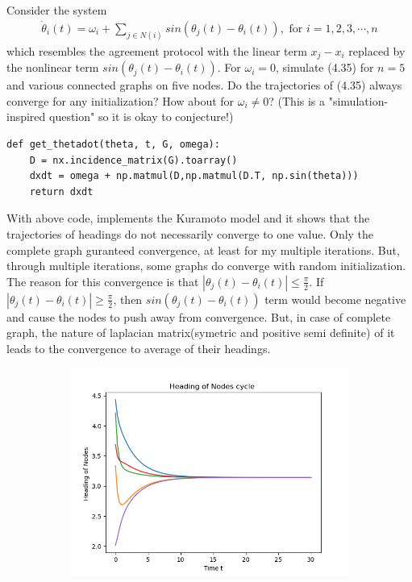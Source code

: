 \documentclass{article}
\begin{document}
\begin{problem}
    Consider the system
    \begin{align*}
        \dot{\theta}_i(t) = \omega_i + \sum_{j \in N(i)} sin(\theta_j(t) - \theta_i(t)), \text{  for } i = 1, 2, 3, \cdots, n
    \end{align*}
    which resembles the agreement protocol with the linear term $x_j - x_i$ replaced by the nonlinear term $sin(\theta_j(t) - \theta_i(t))$. For $\omega_i = 0$, simulate (4.35) for $n = 5$ and various connected graphs on five nodes. Do the trajectories of (4.35) always converge for any initialization? How about for $\omega_i \neq 0$? (This is a "simulation-inspired question" so it is okay to conjecture!) 

    \begin{verbatim}
def get_thetadot(theta, t, G, omega):
    D = nx.incidence_matrix(G).toarray()
    dxdt = omega + np.matmul(D,np.matmul(D.T, np.sin(theta)))
    return dxdt 
    \end{verbatim}
    With above code, implements the Kuramoto model and it shows that the trajectories of headings do not necessarily converge to one value. Only the complete graph guranteed convergence, at least for my multiple iterations. But, through multiple iterations, some graphs do converge with random initialization. The reason for this convergence is that $|\theta_j(t) - \theta_i (t)| \leq \frac{\pi}{2}$. If $|\theta_j(t) - \theta_i (t)| \geq \frac{\pi}{2}$, then  $sin(\theta_j(t) - \theta_i (t))$ term would become negative and cause the nodes to push away from convergence. But, in case of complete graph, the nature of laplacian matrix(symetric and positive semi definite) of it leads to the convergence to average of their headings. 
    \begin{figure}[!h]
        \centering
        \begin{subfigure}{0.35\textwidth}
            \includegraphics[width=\textwidth]{./img/p3_cycle0.png}

\end{subfigure}
\end{figure}
\end{problem}
\end{document}
